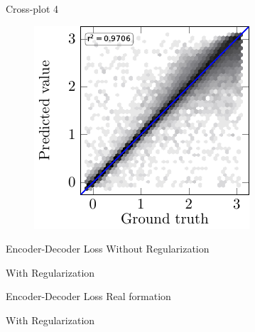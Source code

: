\begin{frame}{Cross-plot 4}
\begin{figure}[!h]
{		\includegraphics[scale=0.85]{Diapos/DL_For_Inv/Figures/Syn_example/Cross_plots/C_P_4/rho_u/9_rho_u_axis.pdf}
		}	
\end{figure}	
\end{frame}


\begin{frame}{Encoder-Decoder Loss}
Without Regularization
\begin{figure}[!h]
				\centering
\end{figure}
\vspace{-0.5cm}
With Regularization
\begin{figure}[!h]
	\centering
\end{figure}
\end{frame}


\begin{frame}{Encoder-Decoder Loss}
Real formation
\begin{figure}[!h]
				\centering
\end{figure}
\vspace{-0.5cm}
With Regularization
\begin{figure}[!h]
	\centering
\end{figure}
\end{frame}



